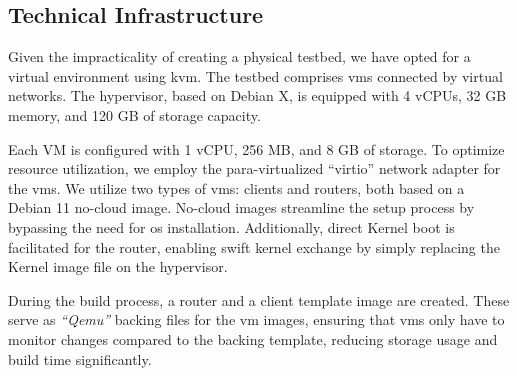 

\subsection{Technical Infrastructure} %
\label{sub:Technical Infrastructure}
Given the impracticality of creating a physical testbed, we have opted for a 
    virtual environment using \gls{kvm}.
The testbed comprises \glspl{vm} connected by virtual networks.
The hypervisor, based on Debian X, is equipped with 4 vCPUs, 32 GB memory, and
    120 GB of storage capacity.

Each VM is configured with 1 vCPU, 256 MB, and 8 GB of storage.
To optimize resource utilization, we employ the para-virtualized ``virtio''
    network adapter for the \glspl{vm}.
We utilize two types of \glspl{vm}: clients and routers, both based on a Debian
    11 no-cloud image.
No-cloud images streamline the setup process by bypassing the need for \gls{os}
    installation.
Additionally, direct Kernel boot is facilitated for the router, enabling swift
    kernel exchange by simply replacing the Kernel image file on the
    hypervisor.

During the build process, a router and a client template image are created.
These serve as \textit{``Qemu''} backing files for the \gls{vm} images,
    ensuring that \glspl{vm} only have to monitor changes compared to the
    backing template, reducing storage usage and build time significantly.

